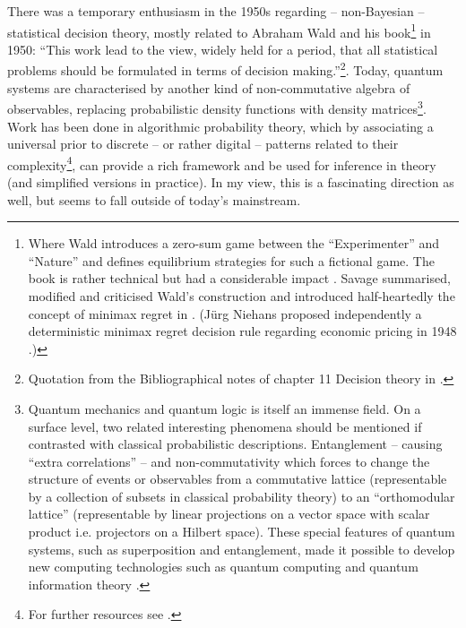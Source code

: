 \documentclass{article}
\begin{document}
There was a temporary enthusiasm in the 1950s regarding -- non-Bayesian -- statistical decision theory, mostly related to Abraham Wald and his book\footnote{Where Wald introduces a zero-sum game between the ``Experimenter'' and ``Nature'' and defines equilibrium strategies for such a fictional game. The book is rather technical but had a considerable impact \cite{book:Wald}. Savage summarised, modified and criticised Wald's construction and introduced half-heartedly the concept of minimax regret in \cite{book:Savage}. (Jürg Niehans proposed independently a deterministic minimax regret decision rule regarding economic pricing in 1948 \cite{paper:MinimaxRegretNiehans1948}.)} in 1950:
``This work lead to the view, widely held for a period, that all statistical
problems should be formulated in terms of decision making.''\footnote{Quotation from the Bibliographical notes of chapter 11 Decision theory in \cite{book:CoxStatistics}.}.
Today, quantum systems are characterised by another kind of non-commutative algebra of observables, replacing probabilistic density functions with density matrices\footnote{Quantum mechanics \cite{book:NeumannQuantum,book:WeinbergQuantumMechanics} and quantum logic \cite{paper:NeumannBirkhoffQuantumLogic} is itself an immense field. On a surface level, two related interesting phenomena should be mentioned if contrasted with classical probabilistic descriptions. Entanglement -- causing ``extra correlations''\cite{book:PitowskyQuantum} -- and non-commutativity which forces to change the structure of events or observables from a commutative lattice (representable by a collection of subsets in classical probability theory) to an ``orthomodular lattice''\cite{sep:QuantumProbability,arxiv:Pitowsky,book:AxiomsForLattices} (representable by linear projections on a vector space with scalar product i.e. projectors on a Hilbert space). These special features of quantum systems, such as superposition and entanglement, made it possible to develop new computing technologies such as quantum computing and quantum information theory \cite{book:QuantumComputationAndInformation}.}.
Work has been done in algorithmic probability theory, which by associating a universal prior to discrete -- or rather digital -- patterns related to their complexity\footnote{For further resources see \cite{book:LiVitanyi,book:Solomonoff,book:UniversalArtificialIntelligence}.}, can provide a rich framework and be used for inference in theory (and simplified versions in practice). In my view, this is a fascinating direction as well, but seems to fall outside of today's mainstream.
\end{document}
